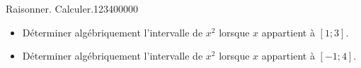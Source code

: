 \begin{pageAD}
\begin{ExoCad}{Raisonner. Calculer.}{1234}{0}{0}{0}{0}{0}
\begin{itemize}[leftmargin=*]
\item Déterminer algébriquement l'intervalle de $x^2$ lorsque $x$ appartient à $[1;3]$. 


%
%
%
%
\item Déterminer algébriquement l'intervalle de $x^2$ lorsque $x$ appartient à $\left[-1;4 \right]$. 


%
%
%
%
%
%
%
%
%
%

\end{itemize}

\end{ExoCad}

\end{pageAD}

